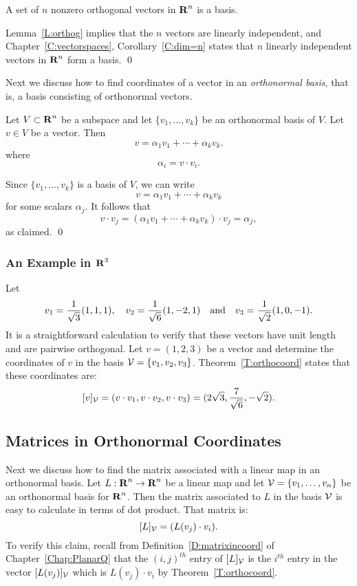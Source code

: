 \begin{cor}
A set of $n$ nonzero orthogonal vectors in $\mbox{$\bf{R}$}^n$ is a basis.
\end{cor}

\proof  Lemma~\ref{L:orthog} implies that the $n$ vectors are linearly
independent, and Chapter~\ref{C:vectorspaces}, Corollary~\ref{C:dim=n} states
that $n$ linearly independent vectors in $\mbox{$\bf{R}$}^n$ form a basis.  \qed

Next we discuss how to find coordinates of a vector in an
{\em orthonormal basis},
that is, a basis consisting of orthonormal vectors.

\begin{thm}  \label{T:orthocoord}
Let $V\subset\mbox{$\bf{R}$}^n$ be a subspace and
let $\{v_1,\ldots,v_k\}$ be an
orthonormal basis of $V$.  Let $v\in V$ be a vector.   Then
\[
v = \alpha_1v_1 + \cdots + \alpha_kv_k.
\]
where
\[
\alpha_i = v\cdot v_i.
\]
\end{thm}

\proof  Since $\{v_1,\ldots,v_k\}$ is a basis of $V$, we can write
\[
v = \alpha_1v_1 + \cdots + \alpha_kv_k
\]
for some scalars $\alpha_j$.  It follows that
\[
v\cdot v_j = (\alpha_1v_1 + \cdots + \alpha_kv_k)\cdot v_j = \alpha_j,
\]
as claimed.   \qed

\subsubsection{An Example in $\mbox{$\bf{R}$}^3$}

Let
\[
v_1 = \frac{1}{\sqrt{3}}(1,1,1), \quad v_2 = \frac{1}{\sqrt{6}}(1,-2,1)
\quad\mbox{and}\quad v_3 = \frac{1}{\sqrt{2}}(1,0,-1).
\]
It is a straightforward calculation to verify that these vectors have
unit length and are pairwise orthogonal.  Let $v=(1,2,3)$ be a vector
and determine the coordinates of $v$ in the basis ${\cal V}=\{v_1,v_2,v_3\}$.
Theorem~\ref{T:orthocoord} states that these coordinates are:
\[
[v]_{\cal V} = (v\cdot v_1, v\cdot v_2, v\cdot v_3)
= (2\sqrt{3},\frac{7}{\sqrt{6}},-\sqrt{2}).
\]


\subsection*{Matrices in Orthonormal Coordinates}

Next we discuss how to find the matrix associated with a linear map in an
orthonormal basis.  Let $L:\mbox{$\bf{R}$}^n\to\mbox{$\bf{R}$}^n$ be a linear map and let
${\cal V} = \{v_1,\ldots,v_n\}$ be an orthonormal basis for $\mbox{$\bf{R}$}^n$.  Then
the matrix associated to $L$ in the basis ${\cal V}$ is easy to calculate
in terms of dot product.  That matrix is:
\begin{equation}  \label{e:coordorthomat}
[L]_{\cal V} = (L(v_j)\cdot v_i).
\end{equation}
To verify this claim, recall from Definition~\ref{D:matrixincoord} of
Chapter~\ref{Chap:PlanarQ} that the $(i,j)^{th}$ entry of $[L]_{\cal V}$ is
the $i^{th}$ entry in the vector $[L(v_j)]_{\cal V}$ which is
$L(v_j)\cdot v_i$ by Theorem~\ref{T:orthocoord}.

